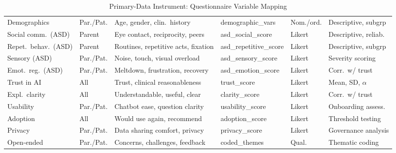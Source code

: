 {\tablestripes\tablefontsize
{}
\begin{xltabular}
{\textwidth}{@{} >{\raggedright\arraybackslash}p{1.8cm} >{\raggedright\arraybackslash}p{1.1cm} >{\raggedright\arraybackslash}p{2.0cm} >{\raggedright\arraybackslash}p{2.3cm} >{\raggedright\arraybackslash}p{1.1cm} L @{}}
\caption[Primary-Data Instrument]{Primary-Data Instrument: Questionnaire Variable Mapping} \label{tab:questionnaire_variable_mapping} \\
\toprule
{} &  &  &  &  &  \\
\midrule
\endfirsthead
\endhead
\bottomrule
\endlastfoot
Demographics & Par./Pat. & Age, gender, clin.\ history & demographic\_\allowbreak vars & Nom./ord. & Descriptive, subgrp \\
Social comm.\ (ASD) & Parent & Eye contact, reciprocity, peers & asd\_\allowbreak social\_\allowbreak score & Likert & Descriptive, reliab. \\
Repet.\ behav.\ (ASD) & Parent & Routines, repetitive acts, fixation & asd\_\allowbreak repetitive\_\allowbreak score & Likert & Descriptive, subgrp \\
Sensory (ASD) & Par./Pat. & Noise, touch, visual overload & asd\_\allowbreak sensory\_\allowbreak score & Likert & Severity scoring \\
Emot.\ reg.\ (ASD) & Par./Pat. & Meltdown, frustration, recovery & asd\_\allowbreak emotion\_\allowbreak score & Likert & Corr.\ w/ trust \\
Trust in AI & All & Trust, clinical reasonableness & trust\_\allowbreak score & Likert & Mean, SD, $\alpha$ \\
Expl.\ clarity & All & Understandable, useful, clear & clarity\_\allowbreak score & Likert & Corr.\ w/ trust \\
Usability & Par./Pat. & Chatbot ease, question clarity & usability\_\allowbreak score & Likert & Onboarding assess. \\
Adoption & All & Would use again, recommend & adoption\_\allowbreak score & Likert & Threshold testing \\
Privacy & Par./Pat. & Data sharing comfort, privacy & privacy\_\allowbreak score & Likert & Governance analysis \\
Open-ended & Par./Pat. & Concerns, challenges, feedback & coded\_\allowbreak themes & Qual. & Thematic coding \\
\end{xltabular}
}
